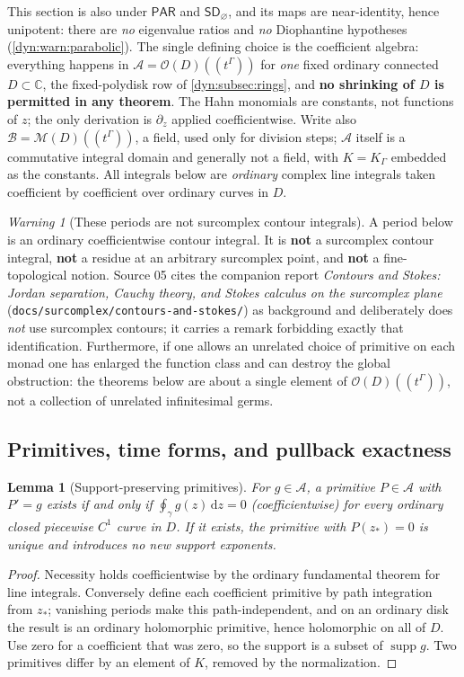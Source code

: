 \documentclass[11pt,letterpaper]{article}
\newtheorem{lemma}[lemma]{Lemma}
\theoremstyle{definition}
\theoremstyle{remark}
\newtheorem{warning}[warning]{Warning}
\newcommand{\C}{\mathbb C}
\newcommand{\OO}{\mathcal O}
\newcommand{\MM}{\mathcal M}
\newcommand{\AAA}{\mathscr A}
\newcommand{\supp}{\operatorname{supp}}
\newcommand{\dd}{\,\mathrm d}
\newcommand{\sdno}{\mathsf{SD}_{\varnothing}}
\newcommand{\pares}{\mathsf{PAR}}
\numberwithin{equation}{section}
\begin{document}
This section is also under $\pares$ and $\sdno$, and its maps are
near-identity, hence unipotent: there are \emph{no} eigenvalue ratios and
\emph{no} Diophantine hypotheses (\cref{dyn:warn:parabolic}). The single
defining choice is the coefficient algebra: everything happens in
$\AAA=\OO(D)((t^{\Gamma}))$ for \emph{one} fixed ordinary connected
$D\subset\C$, the fixed-polydisk row of \cref{dyn:subsec:rings}, and
\textbf{no shrinking of $D$ is permitted in any theorem}. The Hahn
monomials are constants, not functions of $z$; the only derivation is
$\partial_z$ applied coefficientwise. Write also
$\mathcal B=\MM(D)((t^{\Gamma}))$, a field, used only for division steps;
$\AAA$ itself is a commutative integral domain and generally not a field,
with $K=K_\Gamma$ embedded as the constants. All integrals below are
\emph{ordinary} complex line integrals taken coefficient by coefficient
over ordinary curves in $D$.

\begin{warning}[These periods are not surcomplex contour integrals]
\label{dyn:warn:periods}
A period below is an ordinary coefficientwise contour integral. It is
\textbf{not} a surcomplex contour integral, \textbf{not} a residue at an
arbitrary surcomplex point, and \textbf{not} a fine-topological notion.
Source 05 cites the companion report \emph{Contours and Stokes: Jordan
separation, Cauchy theory, and Stokes calculus on the surcomplex plane}
(\texttt{docs/surcomplex/contours-and-stokes/}) as background and
deliberately does \emph{not} use surcomplex contours; it carries a remark
forbidding exactly that identification. Furthermore, if one allows an
unrelated choice of primitive on each monad one has enlarged the function
class and can destroy the global obstruction: the theorems below are about
a single element of $\OO(D)((t^{\Gamma}))$, not a collection of unrelated
infinitesimal germs.
\end{warning}

\subsection{Primitives, time forms, and pullback exactness}

\begin{lemma}[Support-preserving primitives]\label{dyn:lem:primitive}
For $g\in\AAA$, a primitive $P\in\AAA$ with $P'=g$ exists if and only if
$\oint_\gamma g(z)\dd z=0$ (coefficientwise) for every ordinary closed
piecewise $C^{1}$ curve in $D$. If it exists, the primitive with
$P(z_{*})=0$ is unique and introduces no new support exponents.
\end{lemma}
\begin{proof}
Necessity holds coefficientwise by the ordinary fundamental theorem for
line integrals. Conversely define each coefficient primitive by path
integration from $z_{*}$; vanishing periods make this path-independent, and
on an ordinary disk the result is an ordinary holomorphic primitive, hence
holomorphic on all of $D$. Use zero for a coefficient that was zero, so
the support is a subset of $\supp g$. Two primitives differ by an element
of $K$, removed by the normalization.
\end{proof}
\end{document}
